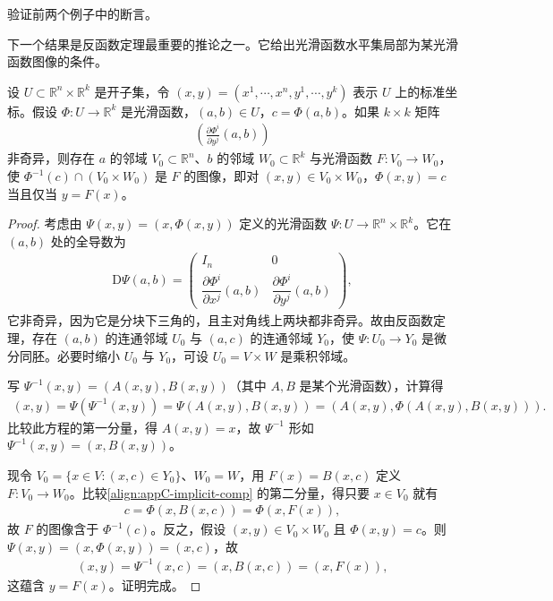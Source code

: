 \documentclass[../../main.tex]{subfiles}
\begin{document}
\begin{exercise}\label{exercise:appC-C-39}
验证前两个例子中的断言。
\end{exercise}

下一个结果是反函数定理最重要的推论之一。它给出光滑函数水平集局部为某光滑函数图像的条件。

\begin{theorem}[隐函数定理]\label{theorem:appC-implicit}
设 $U\subset\mathbb R^n\times\mathbb R^k$ 是开子集，令 $(x,y)=(x^1,\cdots ,x^n,y^1,\cdots ,y^k)$ 表示 $U$ 上的标准坐标。假设 $\Phi:U\to\mathbb R^k$ 是光滑函数，$(a,b)\in U$，$c=\Phi(a,b)$。如果 $k\times k$ 矩阵
\begin{align*}
\left(\frac{\partial\Phi^i}{\partial y^j}(a,b)\right)
\end{align*}
非奇异，则存在 $a$ 的邻域 $V_0\subset\mathbb R^n$、$b$ 的邻域 $W_0\subset\mathbb R^k$ 与光滑函数 $F:V_0\to W_0$，使 $\Phi^{-1}(c)\cap(V_0\times W_0)$ 是 $F$ 的图像，即对 $(x,y)\in V_0\times W_0$，$\Phi(x,y)=c$ 当且仅当 $y=F(x)$。
\end{theorem}

\begin{proof}
考虑由 $\Psi(x,y)=(x,\Phi(x,y))$ 定义的光滑函数 $\Psi:U\to\mathbb R^n\times\mathbb R^k$。它在 $(a,b)$ 处的全导数为
\begin{align*}
\mathrm{D}\Psi(a,b)=\begin{pmatrix}I_n&0\\ \dfrac{\partial\Phi^i}{\partial x^j}(a,b)&\dfrac{\partial\Phi^i}{\partial y^j}(a,b)\end{pmatrix},
\end{align*}
它非奇异，因为它是分块下三角的，且主对角线上两块都非奇异。故由反函数定理，存在 $(a,b)$ 的连通邻域 $U_0$ 与 $(a,c)$ 的连通邻域 $Y_0$，使 $\Psi:U_0\to Y_0$ 是微分同胚。必要时缩小 $U_0$ 与 $Y_0$，可设 $U_0=V\times W$ 是乘积邻域。

写 $\Psi^{-1}(x,y)=(A(x,y),B(x,y))$（其中 $A,B$ 是某个光滑函数），计算得
\begin{align}\label{align:appC-implicit-comp}
(x,y)=\Psi(\Psi^{-1}(x,y))=\Psi(A(x,y),B(x,y))=(A(x,y),\Phi(A(x,y),B(x,y))).
\end{align}
比较此方程的第一分量，得 $A(x,y)=x$，故 $\Psi^{-1}$ 形如 $\Psi^{-1}(x,y)=(x,B(x,y))$。

现令 $V_0=\{x\in V:(x,c)\in Y_0\}$、$W_0=W$，用 $F(x)=B(x,c)$ 定义 $F:V_0\to W_0$。比较\eqref{align:appC-implicit-comp} 的第二分量，得只要 $x\in V_0$ 就有
\begin{align*}
c=\Phi(x,B(x,c))=\Phi(x,F(x)),
\end{align*}
故 $F$ 的图像含于 $\Phi^{-1}(c)$。反之，假设 $(x,y)\in V_0\times W_0$ 且 $\Phi(x,y)=c$。则 $\Psi(x,y)=(x,\Phi(x,y))=(x,c)$，故
\begin{align*}
(x,y)=\Psi^{-1}(x,c)=(x,B(x,c))=(x,F(x)),
\end{align*}
这蕴含 $y=F(x)$。证明完成。
\end{proof}
\end{document}
